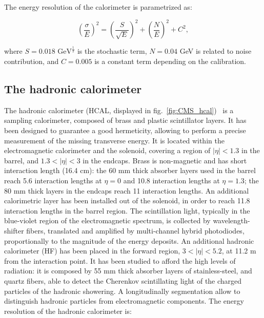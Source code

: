 \noindent The energy resolution of the calorimeter is parametrized as:

\begin{equation}
{\left( \frac{\sigma}{E} \right)}^2 = {\left( \frac{S}{\sqrt{E}} \right)}^2 + {\left( \frac{N}{E} \right)}^2 + C^2,
\end{equation}

\noindent where $S=0.018 \text{ GeV}^{\frac{1}{2}}$ is the stochastic term, $N=0.04$ GeV is related to noise contribution, and $C=0.005$ is a constant term depending on the calibration.


\subsection{The hadronic calorimeter}
The hadronic calorimeter (HCAL, displayed in fig.~\ref{fig:CMS_hcal})~\cite{HCAL-TDR} is a sampling calorimeter, composed of brass and plastic scintillator layers. It has been designed to guarantee a good hermeticity, allowing to perform a precise measurement of the missing transverse energy. It is located within the electromagnetic calorimeter and the solenoid, covering a region of $|\eta|<1.3$ in the barrel, and $1.3<|\eta|<3$ in the endcaps. Brass is non-magnetic and has short interaction length (16.4 cm): the 60 mm thick absorber layers used in the barrel reach 5.6 interaction lengths at $\eta=0$ and 10.8 interaction lengths at $\eta = 1.3$; the 80 mm thick layers in the endcaps reach 11 interaction lengths. An additional calorimetric layer has been installed out of the solenoid, in order to reach 11.8 interaction lengths in the barrel region. The scintillation light, typically in the blue-violet region of the electromagnetic spectrum, is collected by wavelength-shifter fibers, translated and amplified by multi-channel hybrid photodiodes, proportionally to the magnitude of the energy deposits. An additional hadronic calorimeter (HF) has been placed in the forward region, $3 < |\eta| < 5.2$, at 11.2 m from the interaction point. It has been studied to afford the high levels of radiation: it is composed by 55 mm thick absorber layers of stainless-steel, and quartz fibers, able to detect the Cherenkov scintillating light of the charged particles of the hadronic showering. A longitudinally segmentation allow to distinguish hadronic particles from electromagnetic components.
The energy resolution of the hadronic calorimeter is:

